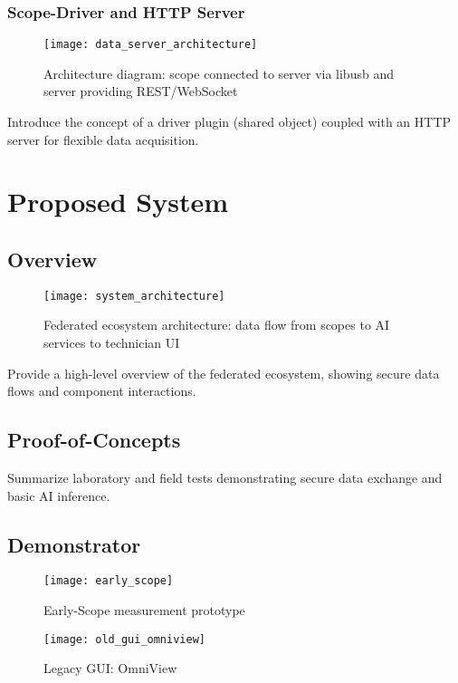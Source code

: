 \subsubsection{Scope-Driver and HTTP Server}
\begin{figure}[ht]
  \centering
  \texttt{[image: data\_server\_architecture]}
  \caption{Architecture diagram: scope connected to server via libusb and server providing REST/WebSocket}
  \label{fig:data-server}
\end{figure}
Introduce the concept of a driver plugin (shared object) coupled with an HTTP server for flexible data acquisition.

\section{Proposed System}
\subsection{Overview}
\begin{figure}[ht]
  \centering
  \texttt{[image: system\_architecture]}
  \caption{Federated ecosystem architecture: data flow from scopes to AI services to technician UI}
  \label{fig:system_architecture}
\end{figure}
Provide a high-level overview of the federated ecosystem, showing secure data flows and component interactions.

\subsection{Proof-of-Concepts}
Summarize laboratory and field tests demonstrating secure data exchange and basic AI inference.

\subsection{Demonstrator}
\begin{figure}[ht]
  \centering
  \texttt{[image: early\_scope]}
  \caption{Early-Scope measurement prototype}
  \label{fig:early-scope}
\end{figure}

\begin{figure}[ht]
  \centering
  \texttt{[image: old\_gui\_omniview]}
  \caption{Legacy GUI: OmniView}
  \label{fig:gui}
\end{figure}

